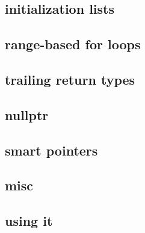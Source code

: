 \subsection{initialization lists}

\subsection{range-based for loops}

\subsection{trailing return types}

\subsection{nullptr}

\subsection{smart pointers}

\subsection{misc}

\subsection{using it}
